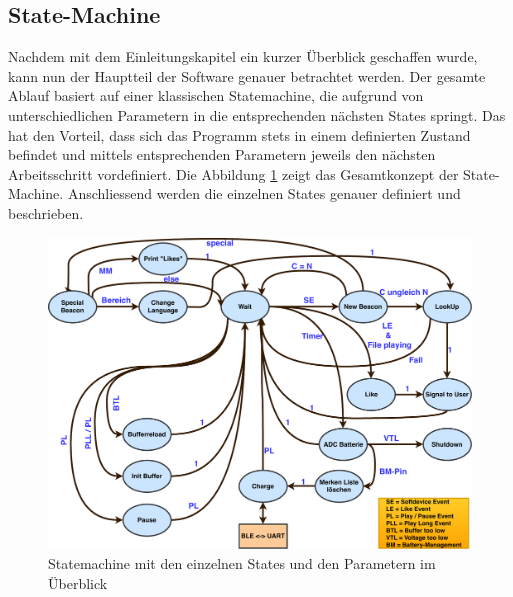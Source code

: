 \newpage
\subsection{State-Machine}\label{sec:stateMachine}

Nachdem mit dem Einleitungskapitel ein kurzer Überblick geschaffen wurde, kann nun der Hauptteil der Software genauer betrachtet werden. Der gesamte Ablauf basiert auf einer klassischen Statemachine, die aufgrund von unterschiedlichen Parametern in die entsprechenden nächsten States springt. Das hat den Vorteil, dass sich das Programm stets in einem definierten Zustand befindet und mittels entsprechenden Parametern jeweils den nächsten Arbeitsschritt vordefiniert. Die Abbildung \ref{fig:completeStateMachine} zeigt das Gesamtkonzept der State-Machine. Anschliessend werden die einzelnen States genauer definiert und beschrieben.

\begin{figure}[htbp]
	\centering
	\includegraphics[width=1.01\textwidth]{Data/StateMachineFinal.pdf}
	\caption[Statemachine-Diagramm]{Statemachine mit den einzelnen States und den Parametern im Überblick }
	\label{fig:completeStateMachine}
\end{figure} 

